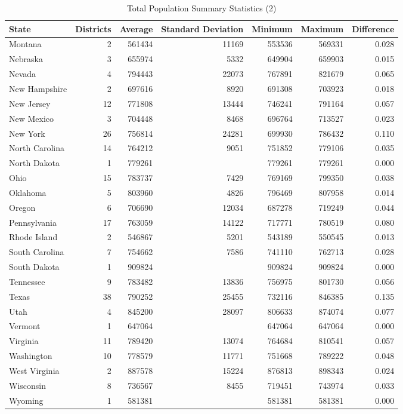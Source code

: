 \documentclass[12pt]{article}
\begin{document}
	\begin{table}[ht]
		\begin{tabular}{lrrrrrr}
		  \hline
		  State & Districts & Average  & Standard Deviation & Minimum & Maximum & Difference \\ 
	  \hline
		  Montana & 2 & 561434 & 11169 & 553536 & 569331 & 0.028 \\ 
	   Nebraska & 3 & 655974 & 5332 & 649904 & 659903 & 0.015 \\ 
	   Nevada & 4 & 794443 & 22073 & 767891 & 821679 & 0.065 \\ 
	   New Hampshire & 2 & 697616 & 8920 & 691308 & 703923 & 0.018 \\ 
	  New Jersey & 12 & 771808 & 13444 & 746241 & 791164 & 0.057 \\ 
	  New Mexico & 3 & 704448 & 8468 & 696764 & 713527 & 0.023 \\ 
	   New York & 26 & 756814 & 24281 & 699930 & 786432 & 0.110 \\ 
	  North Carolina & 14 & 764212 & 9051 & 751852 & 779106 & 0.035 \\ 
	 North Dakota & 1 & 779261 &  & 779261 & 779261 & 0.000 \\ 
	   Ohio & 15 & 783737 & 7429 & 769169 & 799350 & 0.038 \\ 
	   Oklahoma & 5 & 803960 & 4826 & 796469 & 807958 & 0.014 \\ 
	   Oregon & 6 & 706690 & 12034 & 687278 & 719249 & 0.044 \\ 
	  Pennsylvania & 17 & 763059 & 14122 & 717771 & 780519 & 0.080 \\ 
	  Rhode Island & 2 & 546867 & 5201 & 543189 & 550545 & 0.013 \\ 
	 South Carolina & 7 & 754662 & 7586 & 741110 & 762713 & 0.028 \\ 
	  South Dakota & 1 & 909824 &  & 909824 & 909824 & 0.000 \\ 
	   Tennessee & 9 & 783482 & 13836 & 756975 & 801730 & 0.056 \\ 
	   Texas & 38 & 790252 & 25455 & 732116 & 846385 & 0.135 \\ 
	  Utah & 4 & 845200 & 28097 & 806633 & 874074 & 0.077 \\ 
	   Vermont & 1 & 647064 &  & 647064 & 647064 & 0.000 \\ 
	   Virginia & 11 & 789420 & 13074 & 764684 & 810541 & 0.057 \\ 
	   Washington & 10 & 778579 & 11771 & 751668 & 789222 & 0.048 \\ 
	   West Virginia & 2 & 887578 & 15224 & 876813 & 898343 & 0.024 \\ 
	  Wisconsin & 8 & 736567 & 8455 & 719451 & 743974 & 0.033 \\ 
	   Wyoming & 1 & 581381 &  & 581381 & 581381 & 0.000 \\ 
		  \hline
		  
		\end{tabular}
		\label{total_pop_stats2}
		\caption{Total Population Summary Statistics (2)}
	\end{table}
\end{document}

